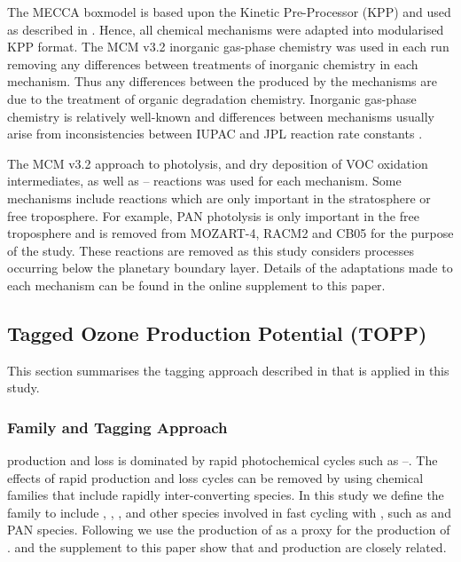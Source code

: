 The MECCA boxmodel \citep{Sander:2005} is based upon the Kinetic Pre-Processor (KPP) \citep{Damian:2002} and used as described in \citet{Butler:2011}. 
Hence, all chemical mechanisms were adapted into modularised KPP format.
The MCM v3.2 inorganic gas-phase chemistry was used in each run removing any differences between treatments of inorganic chemistry in each mechanism.
Thus any differences between the  produced by the mechanisms are due to the treatment of organic degradation chemistry.
Inorganic gas-phase chemistry is relatively well-known and differences between mechanisms usually arise from inconsistencies between IUPAC and JPL reaction rate constants \citep{Emmerson:2009}.

The MCM v3.2 approach to photolysis, and dry deposition of VOC oxidation intermediates, as well as -- reactions was used for each mechanism.
Some mechanisms include reactions which are only important in the stratosphere or free troposphere.
For example, PAN photolysis is only important in the free troposphere \citep{Harwood:2003} and is removed from MOZART-4, RACM2 and CB05 for the purpose of the study. 
These reactions are removed as this study considers processes occurring below the planetary boundary layer.
Details of the adaptations made to each mechanism can be found in the online supplement to this paper.

\subsection{Tagged Ozone Production Potential (TOPP)}
This section summarises the tagging approach described in \citet{Butler:2011} that is applied in this study.

\subsubsection[Ox Family and Tagging Approach]{ Family and Tagging Approach} \label{ss:tagging} %

 production and loss is dominated by rapid photochemical cycles such as --.
The effects of rapid production and loss cycles can be removed by using chemical families that include rapidly inter-converting species.
In this study we define the  family to include , , ,  and other species involved in fast cycling with , such as  and PAN species.
Following \citet{Butler:2011} we use the production of  as a proxy for the production of .
\citet{Butler:2011} and the supplement to this paper show that  and  production are closely related.

